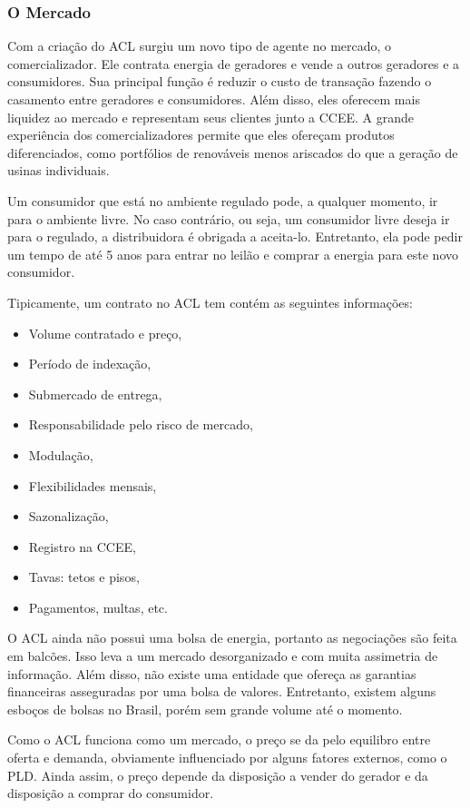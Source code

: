 \subsubsection{O Mercado}

Com a criação do ACL surgiu um novo tipo de agente no mercado, o comercializador. Ele contrata energia de geradores e vende a outros geradores e a consumidores. Sua principal função é reduzir o custo de transação fazendo o casamento entre geradores e consumidores. Além disso, eles oferecem mais liquidez ao mercado e representam seus clientes junto a CCEE. A grande experiência dos comercializadores permite que eles ofereçam produtos diferenciados, como portfólios de renováveis menos ariscados do que a geração de usinas individuais. 

Um consumidor que está no ambiente regulado pode, a qualquer momento, ir para o ambiente livre. No caso contrário, ou seja, um consumidor livre deseja ir para o regulado, a distribuidora é obrigada a aceita-lo. Entretanto, ela pode pedir um tempo de até 5 anos para entrar no leilão e comprar a energia para este novo consumidor. 

Tipicamente, um contrato no ACL tem contém as seguintes informações:

\begin{itemize}
\item Volume contratado e preço,
\item Período de indexação,
\item Submercado de entrega,
\item Responsabilidade pelo risco de mercado,
\item Modulação,
\item Flexibilidades mensais,
\item Sazonalização,
\item Registro na CCEE,
\item Tavas: tetos e pisos,
\item Pagamentos, multas, etc.
\end{itemize}

O ACL ainda não possui uma bolsa de energia, portanto as negociações são feita em balcões. Isso leva a um mercado desorganizado e com muita assimetria de informação. Além disso, não existe uma entidade que ofereça as garantias financeiras asseguradas por uma bolsa de valores. Entretanto, existem alguns esboços de bolsas no Brasil, porém sem grande volume até o momento. 

Como o ACL funciona como um mercado, o preço se da pelo equilibro entre oferta e demanda, obviamente influenciado por alguns fatores externos, como o PLD. Ainda assim, o preço depende da disposição a vender do gerador e da disposição a comprar do consumidor. 

